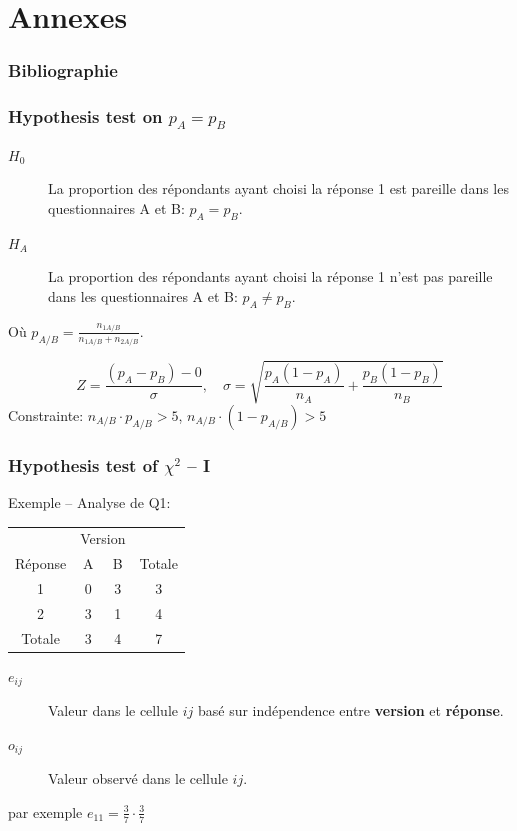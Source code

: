 \documentclass{beamer}
\begin{document}
\section{Annexes}
\begin{frame}
\frametitle{Bibliographie}
\end{frame}

\begin{frame}
  \frametitle{Hypothesis test on $p_A = p_B $}
  \begin{description}
  \item[$H_0$] La proportion des répondants ayant choisi la réponse 1 est
                pareille dans les questionnaires A et B: $p_A = p_B$. 
  \item[$H_A$] La proportion des répondants ayant choisi la réponse
                1 n’est pas  pareille dans les questionnaires A et B: $p_A \ne p_B$.
  \end{description}
  Où $p_{A/B}  = \frac{n_{1A/B}}{n_{1A/B}  + n_{2A/B}}$.

  \[
  Z = \frac{(p_A-p_B) - 0}{\sigma} ,\quad
  \sigma = \sqrt{\frac{p_A(1-p_A)}{n_A} + \frac{p_B(1-p_B)}{n_B}} 
  \]
  Constrainte: $n_{A/B} \cdot p_{A/B} > 5$, $n_{A/B} \cdot (1-p_{A/B}) > 5$ 
\end{frame}

\begin{frame}
  \frametitle{Hypothesis test of $\chi^2$ -- I}
Exemple -- Analyse de Q1:


\begin{center}
\begin{tabular}{c|cc|c}
   & \multicolumn{2}{c|}{Version} &  \\ 
  Réponse  & A & B & Totale \\ \hline
  1 & 0 & 3 & 3 \\
  2 & 3 & 1 & 4 \\ \hline
  Totale & 3 & 4 & 7
\end{tabular}
\end{center}

\begin{description}
\item [$e_{ij}$] Valeur dans le cellule ${ij}$ basé sur indépendence entre
  {\bf version} et {\bf réponse}.
\item [$o_{ij}$] Valeur observé dans le cellule ${ij}$.
\end{description}

par exemple $e_{11} = \frac{3}{7} \cdot \frac{3}{7}$
\end{frame}
\end{document}
